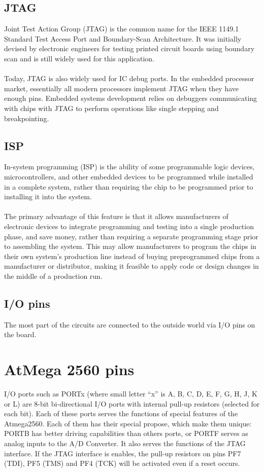 \documentclass[english]{article}
\begin{document}
\subsection{JTAG}
Joint Test Action Group (JTAG) is the common name for the IEEE 1149.1 Standard Test Access Port and Boundary-Scan Architecture. It was initially devised by electronic engineers for testing printed circuit boards using boundary scan and is still widely used for this application.\\\\
Today, JTAG is also widely used for IC debug ports. In the embedded processor market, essentially all modern processors implement JTAG when they have enough pins. Embedded systems development relies on debuggers communicating with chips with JTAG to perform operations like single stepping and breakpointing.
\subsection{ISP}
In-system programming (ISP) is the ability of some programmable logic devices, microcontrollers, and other embedded devices to be programmed while installed in a complete system, rather than requiring the chip to be programmed prior to installing it into the system.\\\\
The primary advantage of this feature is that it allows manufacturers of electronic devices to integrate programming and testing into a single production phase, and save money, rather than requiring a separate programming stage prior to assembling the system. This may allow manufacturers to program the chips in their own system's production line instead of buying preprogrammed chips from a manufacturer or distributor, making it feasible to apply code or design changes in the middle of a production run.
\subsection{I/O pins}
The most part of the circuits are connected to the outside world via I/O pins on the board.
\section{AtMega 2560 pins}
I/O ports such as PORTx (where small letter “x” is A, B, C, D, E, F, G, H, J, K or L) are 8-bit bi-directional I/O ports with internal pull-up resistors (selected for each bit). Each of these ports serves the functions of special features of the Atmega2560. Each of them has their special propose, which make them unique: PORTB has better driving capabilities than others ports, or PORTF serves as analog inputs to the A/D Converter. It also serves the functions of the JTAG interface. If the JTAG interface is enables, the pull-up resistors on pins PF7 (TDI), PF5 (TMS) and PF4 (TCK) will be activated even if a reset occurs.
\end{document}
